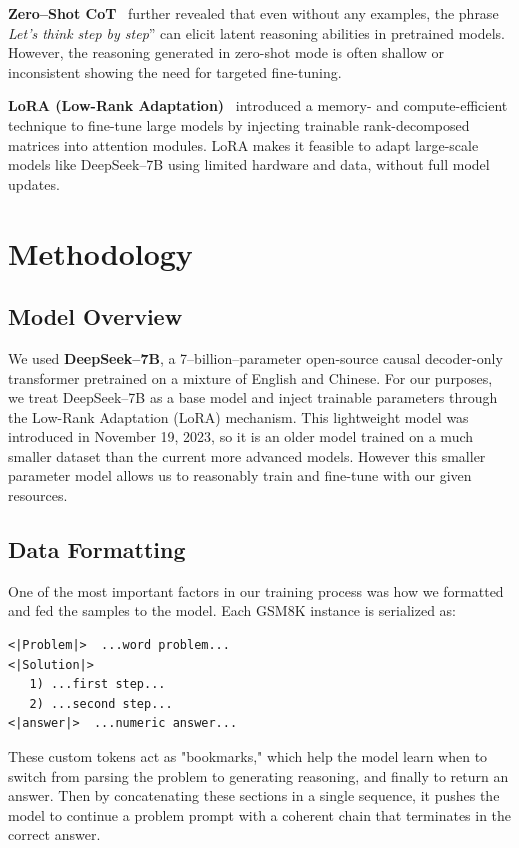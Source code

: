 \documentclass[11pt]{article}
\begin{document}
\textbf{Zero--Shot CoT}~\cite{kojima2022zero} further revealed that even without any examples, the phrase \textit{Let's think step by step}'' can elicit latent reasoning abilities in pretrained models. However, the reasoning generated in zero-shot mode is often shallow or inconsistent showing the need for targeted fine-tuning.

\textbf{LoRA (Low-Rank Adaptation)}~\cite{hu2022lora} introduced a memory- and compute-efficient technique to fine-tune large models by injecting trainable rank-decomposed matrices into attention modules. LoRA makes it feasible to adapt large-scale models like DeepSeek--7B using limited hardware and data, without full model updates.



\section{Methodology}

\subsection{Model Overview}
We used \textbf{DeepSeek--7B}, a 7--billion--parameter open-source causal decoder-only transformer pretrained on a mixture of English and Chinese. For our purposes, we treat DeepSeek--7B as a base model and inject trainable parameters through the Low-Rank Adaptation (LoRA) mechanism. This lightweight model was introduced in November 19, 2023, so it is an older model trained on a much smaller dataset than the current more advanced models. However this smaller parameter model allows us to reasonably train and fine-tune with our given resources.

\subsection{Data Formatting}
One of the most important factors in our training process was how we formatted and fed the samples to the model. Each GSM8K instance is serialized as:
\begin{verbatim}
<|Problem|>  ...word problem...
<|Solution|>
   1) ...first step...
   2) ...second step...
<|answer|>  ...numeric answer...
\end{verbatim}
These custom tokens act as "bookmarks," which help the model learn when to switch from parsing the problem to generating reasoning, and finally to return an answer. Then by concatenating these sections in a single sequence, it pushes the model to continue a problem prompt with a coherent chain that terminates in the correct answer.
\end{document}
